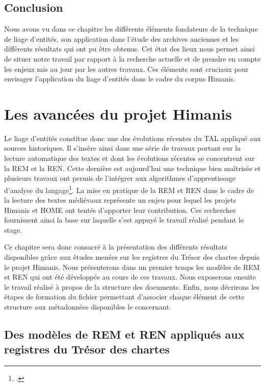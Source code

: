 \documentclass[a4paper,12pt,twoside]{book}
\begin{document}
	\section*{Conclusion}
	
	Nous avons vu dans ce chapitre les différents éléments fondateurs de la technique de liage d'entités, son application dans l'étude des archives anciennes et les différents résultats qui ont pu être obtenus. Cet état des lieux nous permet ainsi de situer notre travail par rapport à la recherche actuelle et de prendre en compte les enjeux mis au jour par les autres travaux. Ces éléments sont cruciaux pour envisager l'application du liage d'entités dans le cadre du corpus Himanis.
	
	\chapter{Les avancées du projet Himanis}
	
	Le liage d'entités constitue donc une des évolutions récentes du TAL appliqué aux sources historiques. Il s'insère ainsi dans une série de travaux portant sur la lecture automatique des textes et dont les évolutions récentes se concentrent sur la REM et la REN. Cette dernière est aujourd'hui une technique bien maîtrisée et plusieurs travaux ont permis de l'intégrer aux algorithmes d'apprentissage d'analyse du langage\footcite{suarez_establishing_2020}. La mise en pratique de la REM et REN dans le cadre de la lecture des textes médiévaux représente un enjeu pour lequel les projets Himanis et HOME ont tentés d'apporter leur contribution. Ces recherches fournissent ainsi la base sur laquelle s'est appuyé le travail réalisé pendant le stage.
	
	Ce chapitre sera donc consacré à la présentation des différents résultats disponibles grâce aux études menées sur les registres du Trésor des chartes depuis le projet Himanis. Nous présenterons dans un premier temps les modèles de REM et REN qui ont été développés au cours de ces travaux. Nous exposerons ensuite le travail réalisé à propos de la structure des documents. Enfin, nous décrirons les étapes de formation du fichier permettant d'associer chaque élément de cette structure aux métadonnées disponibles le concernant.
		
	\section{Des modèles de REM et REN appliqués aux registres du Trésor des chartes}
	
\end{document}
